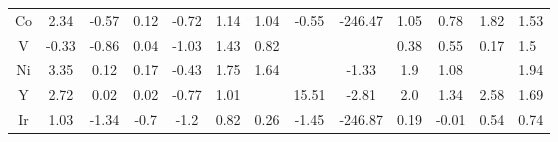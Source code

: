 \begin{center}
\begin{tabular}{| c | c | c | c | c | c | c | c | c | c | c | c |}
Co & 2.34 & -0.57 & 0.12 & -0.72 & 1.14 & 1.04 & -0.55 & -246.47 & 1.05 & 0.78 & 1.82 & 1.53 \\
V & -0.33 & -0.86 & 0.04 & -1.03 & 1.43 & 0.82 &  &  & 0.38 & 0.55 & 0.17 & 1.5 \\
Ni & 3.35 & 0.12 & 0.17 & -0.43 & 1.75 & 1.64 &  & -1.33 & 1.9 & 1.08 &  & 1.94 \\
Y & 2.72 & 0.02 & 0.02 & -0.77 & 1.01 &  & 15.51 & -2.81 & 2.0 & 1.34 & 2.58 & 1.69 \\
Ir & 1.03 & -1.34 & -0.7 & -1.2 & 0.82 & 0.26 & -1.45 & -246.87 & 0.19 & -0.01 & 0.54 & 0.74 \\
\end{tabular}
\end{center}